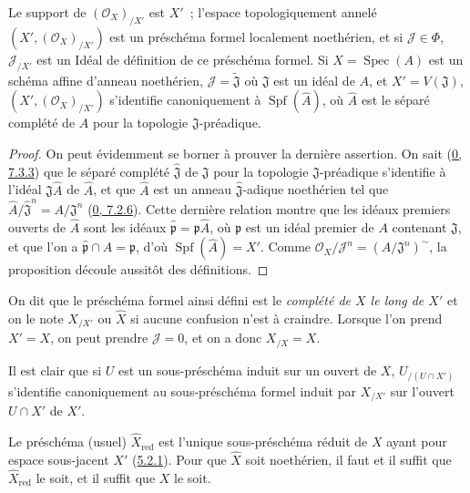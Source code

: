 \begin{proposition}[10.8.5]
\label{I.10.8.5-fr}
Le support de $(\mathscr{O}_X)_{/X'}$ est $X'$~; l'espace topologiquement
annelé $(X',(\mathscr{O}_X)_{/X'})$ est un préschéma formel localement
noethérien, et si $\mathscr{J}\in\Phi$, $\mathscr{J}_{/X'}$ est un Idéal de
définition de ce préschéma formel. Si $X=\operatorname{Spec}(A)$ est un
schéma affine d'anneau noethérien, $\mathscr{J}=\widetilde{\mathfrak{J}}$
où $\mathfrak{J}$ est un idéal de $A$, et $X'=V(\mathfrak{J})$,
$(X',(\mathscr{O}_X)_{/X'})$ s'identifie canoniquement à
$\operatorname{Spf}(\widehat A)$, où $\widehat A$ est le séparé complété de
$A$ pour la topologie $\mathfrak{J}$-préadique.
\end{proposition}

\begin{proof}
On peut évidemment se borner à prouver la dernière assertion. On sait
(\hyperref[0.7.3.3-fr]{0, 7.3.3}) que le séparé complété
$\widehat{\mathfrak{J}}$ de $\mathfrak{J}$ pour la topologie
$\mathfrak{J}$-préadique s'identifie à l'idéal
$\mathfrak{J}\widehat A$ de $\widehat A$, et que $\widehat A$ est un anneau
$\widehat{\mathfrak{J}}$-adique noethérien tel que
$\widehat A/\widehat{\mathfrak{J}}^n=A/\mathfrak{J}^n$
(\hyperref[0.7.2.6-fr]{0, 7.2.6}). Cette dernière relation montre que les
idéaux premiers ouverts de $\widehat A$ sont les idéaux
$\widehat{\mathfrak p}=\mathfrak p\widehat A$, où $\mathfrak p$ est un
idéal premier de $A$ contenant $\mathfrak{J}$, et que l'on a
$\widehat{\mathfrak p}\cap A=\mathfrak p$, d'où
$\operatorname{Spf}(\widehat A)=X'$. Comme
$\mathscr{O}_X/\mathscr{J}^n=(A/\mathfrak{J}^n)^{\sim}$, la proposition
découle aussitôt des définitions.
\end{proof}

On dit que le préschéma formel ainsi défini est le
\emph{complété de $X$ le long de $X'$} et on le note $X_{/X'}$ ou
$\widehat X$ si aucune confusion n'est à craindre. Lorsque l'on prend
$X'=X$, on peut prendre $\mathscr{J}=0$, et on a donc $X_{/X}=X$.

Il est clair que si $U$ est un sous-préschéma induit sur un ouvert de $X$,
$U_{/(U\cap X')}$ s'identifie canoniquement au sous-préschéma formel induit
par $X_{/X'}$ sur l'ouvert $U\cap X'$ de $X'$.

\begin{corollary}[10.8.6]
\label{I.10.8.6-fr}
Le préschéma (usuel) $\widehat X_{\mathrm{red}}$ est l'unique
sous-préschéma réduit de $X$ ayant pour espace sous-jacent $X'$
(\hyperref[I.5.2.1-fr]{5.2.1}). Pour que $\widehat X$ soit noethérien, il
faut et il suffit que $\widehat X_{\mathrm{red}}$ le soit, et il suffit que
$X$ le soit.
\end{corollary}

